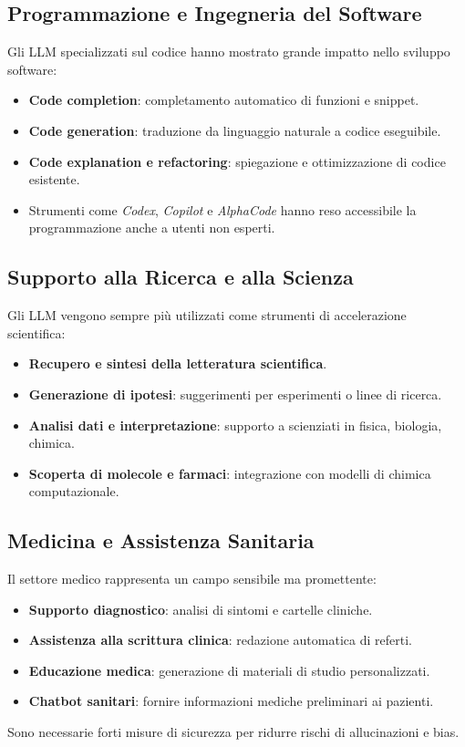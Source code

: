 \subsection{Programmazione e Ingegneria del Software}
Gli LLM specializzati sul codice hanno mostrato grande impatto nello sviluppo software:
\begin{itemize}
    \item \textbf{Code completion}: completamento automatico di funzioni e snippet.
    \item \textbf{Code generation}: traduzione da linguaggio naturale a codice eseguibile.
    \item \textbf{Code explanation e refactoring}: spiegazione e ottimizzazione di codice esistente.
    \item Strumenti come \textit{Codex}, \textit{Copilot} e \textit{AlphaCode} hanno reso accessibile 
    la programmazione anche a utenti non esperti.
\end{itemize}

\subsection{Supporto alla Ricerca e alla Scienza}
Gli LLM vengono sempre più utilizzati come strumenti di accelerazione scientifica:
\begin{itemize}
    \item \textbf{Recupero e sintesi della letteratura scientifica}.
    \item \textbf{Generazione di ipotesi}: suggerimenti per esperimenti o linee di ricerca.
    \item \textbf{Analisi dati e interpretazione}: supporto a scienziati in fisica, biologia, chimica.
    \item \textbf{Scoperta di molecole e farmaci}: integrazione con modelli di chimica computazionale.
\end{itemize}

\subsection{Medicina e Assistenza Sanitaria}
Il settore medico rappresenta un campo sensibile ma promettente:
\begin{itemize}
    \item \textbf{Supporto diagnostico}: analisi di sintomi e cartelle cliniche.
    \item \textbf{Assistenza alla scrittura clinica}: redazione automatica di referti.
    \item \textbf{Educazione medica}: generazione di materiali di studio personalizzati.
    \item \textbf{Chatbot sanitari}: fornire informazioni mediche preliminari ai pazienti.
\end{itemize}
Sono necessarie forti misure di sicurezza per ridurre rischi di allucinazioni e bias.

